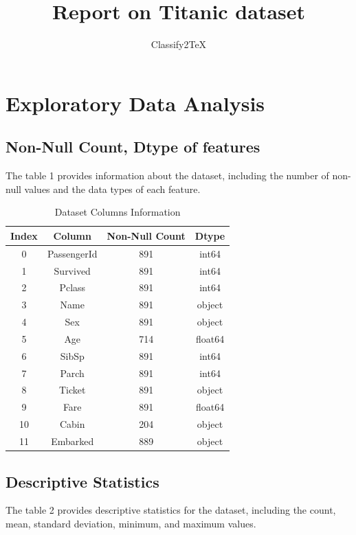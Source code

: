 \documentclass{article}%
\title{Report on Titanic dataset}%
\author{Classify2TeX}%
\begin{document}
%
\normalsize%
\maketitle%
\newpage%
\tableofcontents%
\newpage%
\section{Exploratory Data Analysis}%
\label{sec:ExploratoryDataAnalysis}%
\subsection{Non{-}Null Count, Dtype of features}%
\label{subsec:Non{-}NullCount,Dtypeoffeatures}%
The table 1 provides information about the dataset, including the number of non-null values and the data types of each feature.%


\begin{table}[h!]%
\caption{Dataset Columns Information}%
\vspace{0.2cm}%
\centering%
\begin{tabular}{|c||c||c||c|}%
\hline%
Index&Column&Non{-}Null Count&Dtype\\%
\hline%
0&PassengerId&891&int64\\%
1&Survived&891&int64\\%
2&Pclass&891&int64\\%
3&Name&891&object\\%
4&Sex&891&object\\%
5&Age&714&float64\\%
6&SibSp&891&int64\\%
7&Parch&891&int64\\%
8&Ticket&891&object\\%
9&Fare&891&float64\\%
10&Cabin&204&object\\%
11&Embarked&889&object\\%
\hline%
\end{tabular}%
\end{table}

%
\newpage%
\subsection{Descriptive Statistics}%
\label{subsec:DescriptiveStatistics}%
The table 2 provides descriptive statistics for the dataset, including the count, mean, standard deviation, minimum, and maximum values.%
\end{document}
